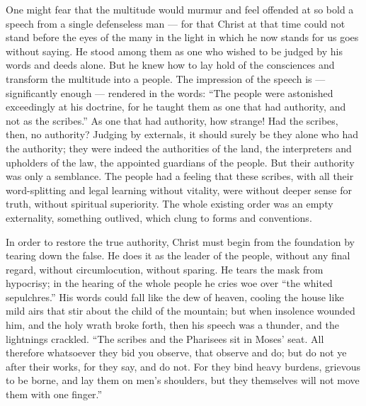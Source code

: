 \documentclass[12pt,a4paper,openany]{book}
\newcommand{\opage}[1]{\marginnote{\footnotesize\textit{[#1]}}}
\begin{document}
One might fear that the multitude would murmur and feel offended at so bold a speech from a single defenseless man --- for that Christ at that time could not stand before the eyes of the many in the light in which he now stands for us goes without saying. He stood among them as one who wished to be judged by his words and deeds alone. But he knew how to lay hold of the consciences and transform the multitude into a people. The impression of the speech is --- significantly enough --- rendered in the words: ``The people were astonished exceedingly at his doctrine, for he taught them as one that had authority, and not as the scribes.'' As one that had authority, how strange! Had the scribes, then, no authority? Judging by externals, it should surely be they alone who had the authority; they were indeed the authorities of the land, the interpreters and upholders of the law, the appointed guardians of the people.
\setcounter{footnote}{0}%
\opage{23}But their authority was only a semblance. The people had a feeling that these scribes, with all their word-splitting and legal learning without vitality, were without deeper sense for truth, without spiritual superiority. The whole existing order was an empty externality, something outlived, which clung to forms and conventions.

In order to restore the true authority, Christ must begin from the foundation by tearing down the false. He does it as the leader of the people, without any final regard, without circumlocution, without sparing. He tears the mask from hypocrisy; in the hearing of the whole people he cries woe over ``the whited sepulchres.'' His words could fall like the dew of heaven, cooling the house like mild airs that stir about the child of the mountain; but when insolence wounded him, and the holy wrath broke forth, then his speech was a thunder, and the lightnings crackled. ``The scribes and the Pharisees sit in Moses' seat. All therefore whatsoever they bid you observe, that observe and do; but do not ye after their works, for they say, and do not. For they bind heavy burdens, grievous to be borne, and lay them on men's shoulders, but they themselves will not move them with one finger.''
\end{document}
